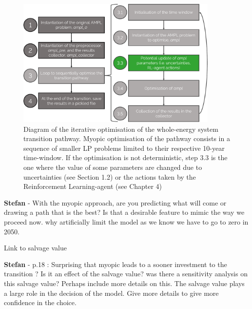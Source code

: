 \documentclass[12pt,a4paper]{article}
\begin{document}
\begin{figure}[htbp!]
\centering
\includegraphics[width=10cm]{MY_process_code.pdf}
\caption{Diagram of the iterative optimisation of the whole-energy system transition pathway. Myopic optimisation of the pathway consists in a sequence of smaller LP problems limited to their respective 10-year time-window. If the optimisation is not deterministic, step 3.3 is the one where the value of some parameters are changed due to uncertainties (see Section 1.2) or the actions taken by the Reinforcement Learning-agent (see Chapter 4)}
\label{fig:MY_process_code}
\end{figure}

\begin{mdframed}[style=comment] %
{\color{teal} \textbf{Stefan}} - With the myopic approach, are you predicting what will come or drawing a path that is the best? Is that a desirable feature to mimic the way we proceed now. why artificially limit the model as we know we have to go to zero in 2050.
\end{mdframed}

\noindent Link to salvage value

\begin{mdframed}[style=manuscript] %

\end{mdframed}

\begin{mdframed}[style=comment] %
{\color{teal} \textbf{Stefan}} - p.18 : Surprising that myopic leads to a sooner investment to the transition ? Is it an effect of the salvage value? was there a sensitivity analysis on this salvage value? Perhaps include more details on this. The salvage value plays a large role in the decision of the model. Give more details to give more confidence in the choice.
\end{mdframed}
\end{document}
